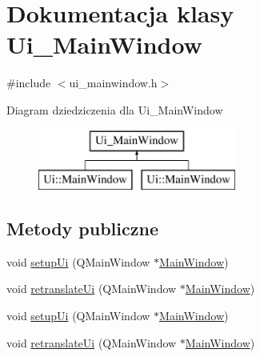 \hypertarget{classUi__MainWindow}{\section{Dokumentacja klasy Ui\-\_\-\-Main\-Window}
\label{classUi__MainWindow}
}


{\ttfamily \#include $<$ui\-\_\-mainwindow.\-h$>$}

Diagram dziedziczenia dla Ui\-\_\-\-Main\-Window\begin{figure}[H]
\begin{center}
\leavevmode
\includegraphics[height=2.000000cm]{classUi__MainWindow}
\end{center}
\end{figure}
\subsection*{Metody publiczne}
\begin{DoxyCompactItemize}
\item 
void \hyperlink{classUi__MainWindow_acf4a0872c4c77d8f43a2ec66ed849b58}{setup\-Ui} (Q\-Main\-Window $\ast$\hyperlink{classMainWindow}{Main\-Window})
\item 
void \hyperlink{classUi__MainWindow_a097dd160c3534a204904cb374412c618}{retranslate\-Ui} (Q\-Main\-Window $\ast$\hyperlink{classMainWindow}{Main\-Window})
\item 
void \hyperlink{classUi__MainWindow_acf4a0872c4c77d8f43a2ec66ed849b58}{setup\-Ui} (Q\-Main\-Window $\ast$\hyperlink{classMainWindow}{Main\-Window})
\item 
void \hyperlink{classUi__MainWindow_a097dd160c3534a204904cb374412c618}{retranslate\-Ui} (Q\-Main\-Window $\ast$\hyperlink{classMainWindow}{Main\-Window})
\end{DoxyCompactItemize}
